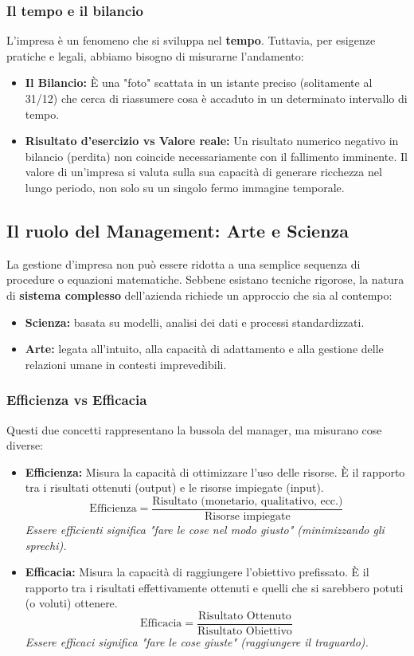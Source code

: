 \documentclass[a4paper,12pt]{article}
\begin{document}
	\subsubsection{Il tempo e il bilancio}
	L'impresa è un fenomeno che si sviluppa nel \textbf{tempo}. Tuttavia, per esigenze pratiche e legali, abbiamo bisogno di misurarne l'andamento:
	\begin{itemize}
		\item \textbf{Il Bilancio:} È una "foto" scattata in un istante preciso (solitamente al 31/12) che cerca di riassumere cosa è accaduto in un determinato intervallo di tempo.
		\item \textbf{Risultato d'esercizio vs Valore reale:} Un risultato numerico negativo in bilancio (perdita) non coincide necessariamente con il fallimento imminente. Il valore di un'impresa si valuta sulla sua capacità di generare ricchezza nel lungo periodo, non solo su un singolo fermo immagine temporale.
	\end{itemize}
	
	\subsection{Il ruolo del Management: Arte e Scienza}
	La gestione d'impresa non può essere ridotta a una semplice sequenza di procedure o equazioni matematiche. Sebbene esistano tecniche rigorose, la natura di \textbf{sistema complesso} dell'azienda richiede un approccio che sia al contempo:
	\begin{itemize}
		\item \textbf{Scienza:} basata su modelli, analisi dei dati e processi standardizzati.
		\item \textbf{Arte:} legata all'intuito, alla capacità di adattamento e alla gestione delle relazioni umane in contesti imprevedibili.
	\end{itemize}
	
	\subsubsection{Efficienza vs Efficacia}
	Questi due concetti rappresentano la bussola del manager, ma misurano cose diverse:
	
	\begin{itemize}
		\item \textbf{Efficienza:} Misura la capacità di ottimizzare l'uso delle risorse. È il rapporto tra i risultati ottenuti (output) e le risorse impiegate (input).
		$$ \text{Efficienza} = \frac{\text{Risultato (monetario, qualitativo, ecc.)}}{\text{Risorse impiegate}} $$
		\textit{Essere efficienti significa "fare le cose nel modo giusto" (minimizzando gli sprechi).}
		
		\item \textbf{Efficacia:} Misura la capacità di raggiungere l'obiettivo prefissato. È il rapporto tra i risultati effettivamente ottenuti e quelli che si sarebbero potuti (o voluti) ottenere.
		$$ \text{Efficacia} = \frac{\text{Risultato Ottenuto}}{\text{Risultato Obiettivo}} $$
		\textit{Essere efficaci significa "fare le cose giuste" (raggiungere il traguardo).}
	\end{itemize}
	
\end{document}
